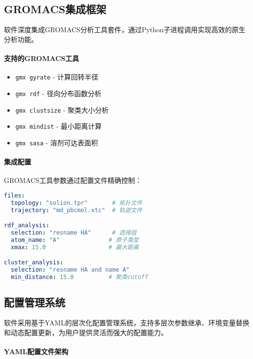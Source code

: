 \subsection{GROMACS集成框架}
\label{subsec:gromacs_integration}

软件深度集成GROMACS分析工具套件，通过Python子进程调用实现高效的原生分析功能。

\paragraph{支持的GROMACS工具}

\begin{itemize}
    \item \lstinline|gmx gyrate| - 计算回转半径
    \item \lstinline|gmx rdf| - 径向分布函数分析
    \item \lstinline|gmx clustsize| - 聚类大小分析
    \item \lstinline|gmx mindist| - 最小距离计算
    \item \lstinline|gmx sasa| - 溶剂可达表面积
\end{itemize}

\paragraph{集成配置}

GROMACS工具参数通过配置文件精确控制：

\begin{lstlisting}[language=yaml,style=blockstyle]
files:
  topology: "solion.tpr"       # 拓扑文件
  trajectory: "md_pbcmol.xtc"  # 轨迹文件

rdf_analysis:
  selection: "resname HA"      # 选择组
  atom_name: "A"              # 原子类型
  xmax: 15.0                  # 最大距离

cluster_analysis:
  selection: "resname HA and name A"
  min_distance: 15.0          # 聚类cutoff
\end{lstlisting}

\subsection{配置管理系统}
\label{subsec:config_management}

软件采用基于YAML的层次化配置管理系统，支持多层次参数继承、环境变量替换和动态配置更新，为用户提供灵活而强大的配置能力。

\paragraph{YAML配置文件架构}

